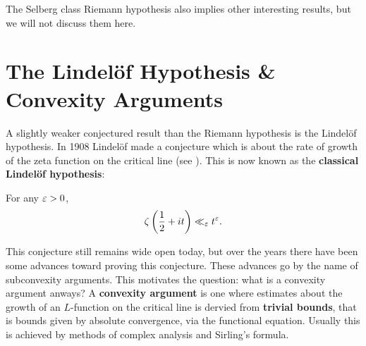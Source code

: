       The Selberg class Riemann hypothesis also implies other interesting results, but we will not discuss them here.
  \section{The Lindel\"of Hypothesis \& Convexity Arguments}
    A slightly weaker conjectured result than the Riemann hypothesis is the Lindel\"of hypothesis. In 1908 Lindel\"of made a conjecture which is about the rate of growth of the zeta function on the critical line (see \cite{lindelof1908quelques}). This is now known as the \textbf{classical Lindel\"of hypothesis}:

    \begin{conjecture}
      For any $\varepsilon > 0$,
      \[
        \zeta\left(\frac{1}{2}+it\right) \ll_{\varepsilon} t^{\varepsilon}.
      \]
    \end{conjecture}

    This conjecture still remains wide open today, but over the years there have been some advances toward proving this conjecture. These advances go by the name of subconvexity arguments. This motivates the question: what is a convexity argument anways? A \textbf{convexity argument} is one where estimates about the growth of an $L$-function on the critical line is dervied from \textbf{trivial bounds}, that is bounds given by absolute convergence, via the functional equation. Usually this is achieved by methods of complex analysis and Sirling's formula.

